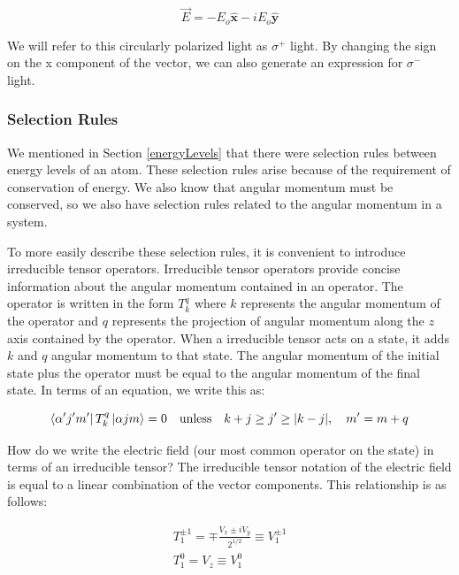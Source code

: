 \documentclass[12pt]{article}
\newcommand{\xhat}{\hat{\textbf{x}}}
\newcommand{\yhat}{\hat{\textbf{y}}}
\begin{document}
		\begin{equation}\label{circleLight}
			\vec{E}=-E_o \xhat  -iE_o \yhat 
		\end{equation}

		We will refer to this circularly polarized light as 
		$\sigma^{+}$ light. By changing the sign on the 
		x component of the vector, we can also generate 
		an expression for $\sigma^{-}$ light.

		\subsubsection{Selection Rules}\label{selectionRules}
		We mentioned in Section \ref{energyLevels} that there
		were selection rules between energy levels of an atom.
		These selection rules arise because of the requirement
		of conservation of energy. We also know that angular 
		momentum must be conserved, so we also have selection
		rules related to the angular momentum in a system. 

		To more easily describe these selection rules, it is
		convenient to introduce irreducible tensor operators. 
		Irreducible tensor operators provide concise information
		about the angular momentum contained in an operator.
		The operator is written in the form $T^{q}_{k}$ where
		$k$ represents the angular momentum of the operator
		and $q$ represents the projection of angular momentum
		along the $z$ axis contained by the operator. When a
		irreducible tensor acts on a state, it adds $k$ and 
		$q$ angular momentum to that state. The angular momentum
		of the initial state plus the operator must be
		equal to the angular momentum of the final state. In
		terms of an equation, we write this as: 

		\begin{equation}
			\bra{\alpha'j'm'}T^{q}_{k}\ket{\alpha jm}=0\quad \textrm{unless} \quad k+j\geq j' 
			\geq \vert k-j \vert,\quad m'=m+q
		\end{equation}

		How do we write the electric field (our most common
		operator on the state) in terms of an irreducible 
		tensor? The irreducible tensor notation of the 
		electric field is equal to a linear combination of
		the vector components. This relationship is as 
		follows:

		\begin{gather}
			T^{\pm1}_1 = \mp \frac{V_x \pm iV_y}{2^{1/2}} 
						\equiv V^{\pm1}_{1}\label{sphericalTensor} 
			\\
			T^{0}_1 = V_z \equiv V^{0}_{1} 
		\end{gather}
\end{document}

